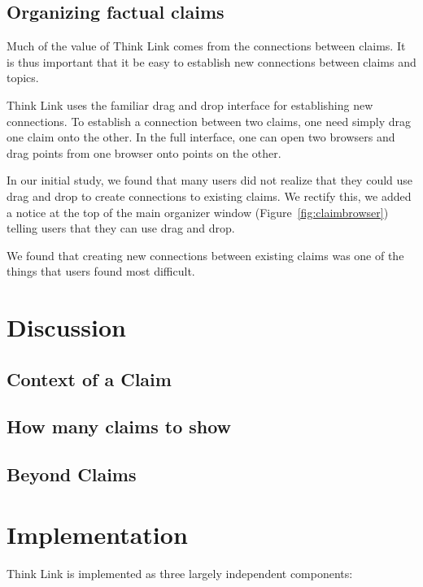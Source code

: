 \documentclass{chi2009}
\newcommand{\todo}[1]{}
\begin{document}
\subsection{Organizing factual claims}

Much of the value of Think Link comes from the connections between claims. It is thus important that it be easy to establish new connections between claims and topics. 

Think Link uses the familiar drag and drop interface for establishing new connections. To establish a connection between two claims, one need simply drag one claim onto the other. In the full interface, one can open two browsers and drag points from one browser onto points on the other.

In our initial study, we found that many users did not realize that they could use drag and drop to create connections to existing claims. We rectify this, we added a notice at the top of the main organizer window (Figure~\ref{fig:claimbrowser}) telling users that they can use drag and drop.

We found that creating new connections between existing claims was one of the things that users found most difficult.

\todo{say more here}

\section{Discussion}

\subsection{Context of a Claim}

\subsection{How many claims to show}

\subsection{Beyond Claims}

\section{Implementation}

Think Link is implemented as three largely independent components:
\end{document}
